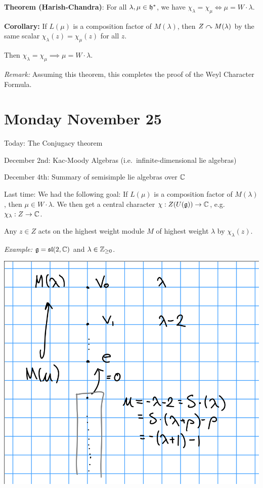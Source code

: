 \textbf{Theorem (Harish-Chandra)}: For all \(\lambda, \mu \in {\mathfrak{h}}^*\),
we have \(\chi_\lambda = \chi_\mu \iff \mu = W \cdot \lambda\).

\textbf{Corollary:} If \(L(\mu)\) is a composition factor of
\(M(\lambda)\), then \(Z \curvearrowright M(\lambda)\) by the same scalar
\(\chi_\lambda(z) = \chi_\mu(z)\) for all \(z\).

Then \(\chi_\lambda = \chi_\mu \implies \mu = W \cdot \lambda\).

\emph{Remark:} Assuming this theorem, this completes the proof of the
Weyl Character Formula.

\hypertarget{monday-november-25}{%
\section{Monday November 25}\label{monday-november-25}}

Today: The Conjugacy theorem

December 2nd: Kac-Moody Algebras (i.e.~infinite-dimensional lie
algebras)

December 4th: Summary of semisimple lie algebras over \({\mathbb{C}}\)

Last time: We had the following goal: If \(L(\mu)\) is a composition
factor of \(M(\lambda)\), then \(\mu \in W\cdot \lambda\). We then get a
central character \(\chi: Z(U({\mathfrak{g}})) \to {\mathbb{C}}\),
e.g.~\(\chi_\lambda: Z\to {\mathbb{C}}\).

Any \(z\in Z\) acts on the highest weight module \(M\) of highest weight
\(\lambda\) by \(\chi_\lambda(z)\).

\emph{Example:} \({\mathfrak{g}} = {\mathfrak{sl}}(2, {\mathbb{C}})\) and
\(\lambda \in {\mathbb{Z}}_{\geq 0}\).

\includegraphics{figures/2019-11-25-09:18.png}\\

